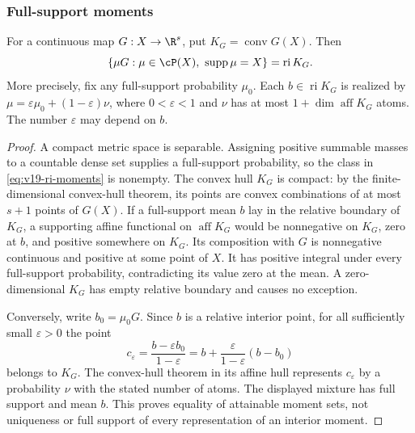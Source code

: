 \subsubsection{Full-support moments}
\begin{lemma}
\label{lem:v19-moment-image}
For a continuous map $G:X\to\R^s$, put $K_G=\operatorname{conv}G(X)$.
Then
\begin{equation}\label{eq:v19-ri-moments}
 \{\mu G:\mu\in\cP(X),\ \operatorname{supp}\mu=X\}
       =\operatorname{ri}K_G.
\end{equation}
More precisely, fix any full-support probability $\mu_0$. Each
$b\in\operatorname{ri}K_G$ is realized by
$\mu=\varepsilon\mu_0+(1-\varepsilon)\nu$, where $0<\varepsilon<1$
and $\nu$ has at most $1+\dim\operatorname{aff}K_G$ atoms.
The number $\varepsilon$ may depend on $b$.
\end{lemma}
\begin{proof}
A compact metric space is separable. Assigning positive summable masses
to a countable dense set supplies a full-support probability, so the
class in \eqref{eq:v19-ri-moments} is nonempty. The convex hull $K_G$
is compact: by the finite-dimensional convex-hull theorem, its points
are convex combinations of at most $s+1$ points of $G(X)$.
If a full-support mean $b$ lay in the relative boundary of $K_G$, a
supporting affine functional on $\operatorname{aff}K_G$ would be
nonnegative on $K_G$, zero at $b$, and positive somewhere on $K_G$.
Its composition with $G$ is nonnegative continuous and positive at
some point of $X$. It has positive integral under every full-support
probability, contradicting its value zero at the mean. A zero-dimensional
$K_G$ has empty relative boundary and causes no exception.

Conversely, write $b_0=\mu_0G$. Since $b$ is a relative interior point,
for all sufficiently small $\varepsilon>0$ the point
\[
 c_\varepsilon=\frac{b-\varepsilon b_0}{1-\varepsilon}
             =b+\frac{\varepsilon}{1-\varepsilon}(b-b_0)
\]
belongs to $K_G$. The convex-hull theorem in its affine hull represents
$c_\varepsilon$ by a probability $\nu$ with the stated number of atoms.
The displayed mixture has full support and mean $b$.
This proves equality of attainable moment sets, not uniqueness or
full support of every representation of an interior moment.
\end{proof}

